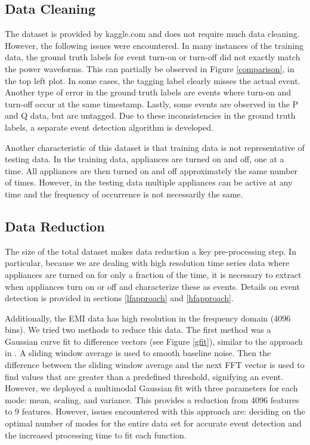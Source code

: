 \documentclass[11pt, letterpaper]{article}
\begin{document}
\subsection{Data Cleaning}
The dataset is provided by kaggle.com and does not require much data cleaning.  However, the following issues were encountered. In many instances of the training data, the ground truth labels for event turn-on or turn-off did not exactly match the power waveforms.  This can partially be observed in Figure \ref{comparison}, in the top left plot.  In some cases, the tagging label clearly misses the actual event.  Another type of error in the ground truth labels are events where turn-on and turn-off occur at the same timestamp.  Lastly, some events are observed in the P and Q data, but are untagged.  Due to these inconsistencies in the ground truth labels, a separate event detection algorithm is developed.

Another characteristic of this dataset is that training data is not representative of testing data.  In the training data, appliances are turned on and off, one at a time.  All appliances are then turned on and off approximately the same number of times.  However, in the testing data multiple appliances can be active at any time and the frequency of occurrence is not necessarily the same.  

\subsection{Data Reduction}

The size of the total dataset makes data reduction a key pre-processing step.  In particular, because we are dealing with high resolution time series data where appliances are turned on for only a fraction of the time, it is necessary to extract when appliances turn on or off and characterize these as events. Details on event detection is provided in sections \ref{lfapproach} and \ref{hfapproach}.

Additionally, the EMI data has high resolution in the frequency domain (4096 bins).  We tried two methods to reduce this data.  The first method was a Gaussian curve fit to difference vectors (see Figure \ref{gfit}), similar to the approach in \cite{EMI}. A sliding window average is used to smooth baseline noise. Then the difference between the sliding window average and the next FFT vector is used to find values that are greater than a predefined threshold, signifying an event. However, we deployed a multimodal Gaussian fit with three parameters for each mode: mean, scaling, and variance.  This provides a reduction from 4096 features to 9 features.  However, issues encountered with this approach are: deciding on the optimal number of modes for the entire data set for accurate event detection and the increased processing time to fit each function. 
\end{document}
